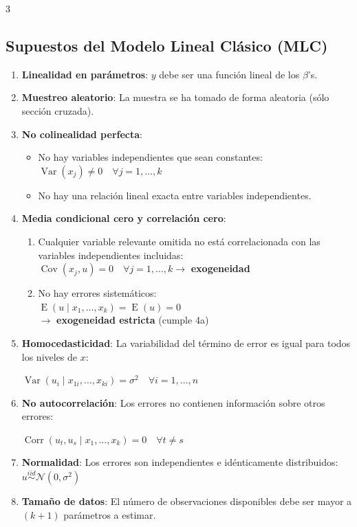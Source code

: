 \documentclass[10pt, a4paper, landscape]{article}
\DeclareMathOperator{\E}{E}
\DeclareMathOperator{\Var}{Var}
\DeclareMathOperator{\Cov}{Cov}
\DeclareMathOperator{\Corr}{Corr}
\begin{document}
\begin{multicols}{3}
\subsection*{Supuestos del Modelo Lineal Clásico (MLC)}

\begin{enumerate}[leftmargin=*]
	\item \textbf{Linealidad en parámetros}: \( y \) debe ser una función lineal de los \( \beta \)'s.
	\item \textbf{Muestreo aleatorio}: La muestra se ha tomado de forma aleatoria (sólo sección cruzada).
	\item \textbf{No colinealidad perfecta}:
	\begin{itemize}[leftmargin=*]
		\item No hay variables independientes que sean constantes: \( \Var(x_{j}) \neq 0 \quad \forall j = 1, \ldots, k \)
		\item No hay una relación lineal exacta entre variables independientes.
	\end{itemize}
	\item \textbf{Media condicional cero y correlación cero}:
	\begin{enumerate}[leftmargin=*, label=\alph{*}.]
		\item Cualquier variable relevante omitida no está correlacionada con las variables independientes incluidas: \\
		\( \Cov(x_{j}, u) = 0 \quad \forall j = 1, \ldots, k \rightarrow \) \textbf{exogeneidad}
		\item No hay errores sistemáticos: \\
		\( \E(u \mid x_{1}, \ldots, x_{k}) = \E(u) = 0 \) \\
		\( \rightarrow \) \textbf{exogeneidad estricta} (cumple 4a)
	\end{enumerate}
	\item \textbf{Homocedasticidad}: La variabilidad del término de error es igual para todos los niveles de \( x \):
	\begin{center}
		\( \Var(u_{i} \mid x_{1i}, \ldots, x_{ki}) = \sigma^{2} \quad \forall i = 1, \ldots, n \)
	\end{center}
	\item \textbf{No autocorrelación}: Los errores no contienen información sobre otros errores:
	\begin{center}
		\( \Corr(u_{t}, u_{s} \mid x_{1}, \ldots, x_{k}) = 0 \quad \forall t \neq s \)
	\end{center}
	\item \textbf{Normalidad}: Los errores son independientes e idénticamente distribuidos: \( u \overset{iid}{\sim} \mathcal{N} (0, \sigma^{2}) \)
	\item \textbf{Tamaño de datos}: El número de observaciones disponibles debe ser mayor a \( (k + 1) \) parámetros a estimar.
\end{enumerate}


\end{multicols}
\end{document}
